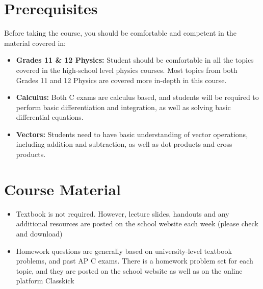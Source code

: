 \documentclass{../oss-handout}
\begin{document}
\section*{Prerequisites}
Before taking the course, you should be comfortable and competent in the
material covered in:
\begin{itemize}[nosep,leftmargin=15pt]
\item\textbf{Grades 11 \& 12 Physics:} Student should be comfortable in all the
  topics covered in the high-school level physics courses. Most topics from
  both Grades 11 and 12 Physics are covered more in-depth in this course.
\item\textbf{Calculus:} Both C exams are calculus based, and students will be
  required to perform basic differentiation and integration, as well as solving
  basic differential equations.
\item\textbf{Vectors:} Students need to have basic understanding of vector
  operations, including addition and subtraction, as well as dot products and
  cross products.
\end{itemize}


\section*{Course Material}
\begin{itemize}[nosep,leftmargin=15pt]
\item Textbook is not required. However, lecture slides, handouts and any
  additional resources are posted on the school website each week (please check
  and download)
\item Homework questions are generally based on university-level textbook
  problems, and past AP C exams. There is a homework problem set for each
  topic, and they are posted on the school website as well as on the online
  platform Classkick
\end{itemize}
\end{document}
